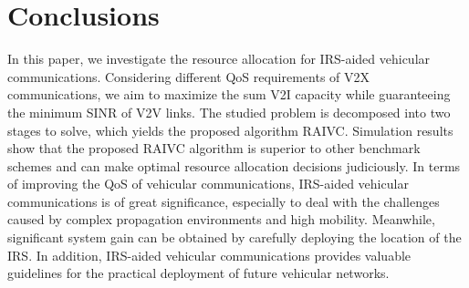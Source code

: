 \documentclass[journal]{IEEEtran}
\begin{document}
\section{Conclusions}
In this paper, we investigate the resource allocation for IRS-aided vehicular communications. Considering different QoS requirements of V2X communications, we aim to maximize the sum V2I capacity while guaranteeing the minimum SINR of V2V links. The studied problem is decomposed into two stages to solve, which yields the proposed algorithm RAIVC. Simulation results show that the proposed RAIVC algorithm is superior to other benchmark schemes and can make optimal resource allocation decisions judiciously. In terms of improving the QoS of vehicular communications, IRS-aided vehicular communications is of great significance, especially to deal with the challenges caused by complex propagation environments and high mobility. Meanwhile, significant system gain can be obtained by carefully deploying the location of the IRS. In addition, IRS-aided vehicular communications provides valuable guidelines for the practical deployment of future vehicular networks.






%


%
\end{document}

